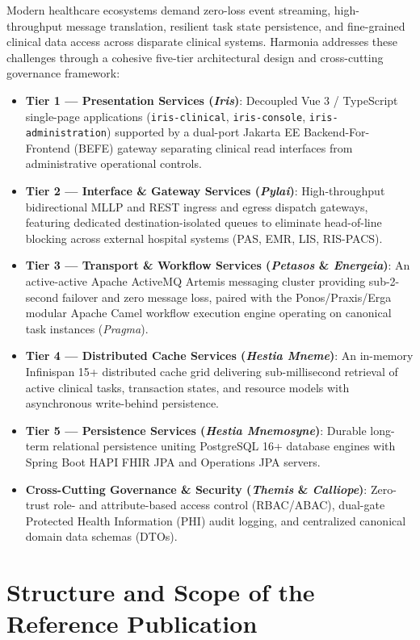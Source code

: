 Modern healthcare ecosystems demand zero-loss event streaming, high-throughput message translation, resilient task state persistence, and fine-grained clinical data access across disparate clinical systems. Harmonia addresses these challenges through a cohesive five-tier architectural design and cross-cutting governance framework:
\begin{itemize}
    \item \textbf{Tier 1 --- Presentation Services (\textit{Iris})}: Decoupled Vue 3 / TypeScript single-page applications (\texttt{iris-clinical}, \texttt{iris-console}, \texttt{iris-administration}) supported by a dual-port Jakarta EE Backend-For-Frontend (BEFE) gateway separating clinical read interfaces from administrative operational controls.
    \item \textbf{Tier 2 --- Interface \& Gateway Services (\textit{Pylai})}: High-throughput bidirectional MLLP and REST ingress and egress dispatch gateways, featuring dedicated destination-isolated queues to eliminate head-of-line blocking across external hospital systems (PAS, EMR, LIS, RIS-PACS).
    \item \textbf{Tier 3 --- Transport \& Workflow Services (\textit{Petasos} \& \textit{Energeia})}: An active-active Apache ActiveMQ Artemis messaging cluster providing sub-2-second failover and zero message loss, paired with the Ponos/Praxis/Erga modular Apache Camel workflow execution engine operating on canonical task instances (\textit{Pragma}).
    \item \textbf{Tier 4 --- Distributed Cache Services (\textit{Hestia Mneme})}: An in-memory Infinispan 15+ distributed cache grid delivering sub-millisecond retrieval of active clinical tasks, transaction states, and resource models with asynchronous write-behind persistence.
    \item \textbf{Tier 5 --- Persistence Services (\textit{Hestia Mnemosyne})}: Durable long-term relational persistence uniting PostgreSQL 16+ database engines with Spring Boot HAPI FHIR JPA and Operations JPA servers.
    \item \textbf{Cross-Cutting Governance \& Security (\textit{Themis} \& \textit{Calliope})}: Zero-trust role- and attribute-based access control (RBAC/ABAC), dual-gate Protected Health Information (PHI) audit logging, and centralized canonical domain data schemas (DTOs).
\end{itemize}

\section*{Structure and Scope of the Reference Publication}

